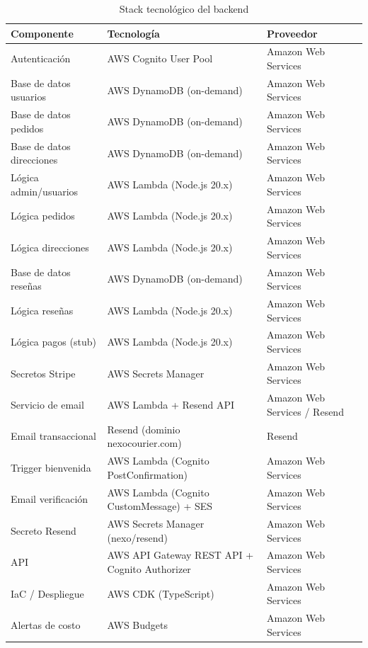 \documentclass[12pt,a4paper]{article}
\begin{document}
\begin{table}[H]
\centering
\begin{tabular}{@{}lll@{}}
\toprule
\textbf{Componente} & \textbf{Tecnología} & \textbf{Proveedor} \\
\midrule
Autenticación & AWS Cognito User Pool & Amazon Web Services \\
Base de datos usuarios & AWS DynamoDB (on-demand) & Amazon Web Services \\
Base de datos pedidos & AWS DynamoDB (on-demand) & Amazon Web Services \\
Base de datos direcciones & AWS DynamoDB (on-demand) & Amazon Web Services \\
Lógica admin/usuarios & AWS Lambda (Node.js 20.x) & Amazon Web Services \\
Lógica pedidos & AWS Lambda (Node.js 20.x) & Amazon Web Services \\
Lógica direcciones & AWS Lambda (Node.js 20.x) & Amazon Web Services \\
Base de datos reseñas & AWS DynamoDB (on-demand) & Amazon Web Services \\
Lógica reseñas & AWS Lambda (Node.js 20.x) & Amazon Web Services \\
Lógica pagos (stub) & AWS Lambda (Node.js 20.x) & Amazon Web Services \\
Secretos Stripe & AWS Secrets Manager & Amazon Web Services \\
Servicio de email & AWS Lambda + Resend API & Amazon Web Services / Resend \\
Email transaccional & Resend (dominio nexocourier.com) & Resend \\
Trigger bienvenida & AWS Lambda (Cognito PostConfirmation) & Amazon Web Services \\
Email verificación & AWS Lambda (Cognito CustomMessage) + SES & Amazon Web Services \\
Secreto Resend & AWS Secrets Manager (nexo/resend) & Amazon Web Services \\
API & AWS API Gateway REST API + Cognito Authorizer & Amazon Web Services \\
IaC / Despliegue & AWS CDK (TypeScript) & Amazon Web Services \\
Alertas de costo & AWS Budgets & Amazon Web Services \\
\bottomrule
\end{tabular}
\caption{Stack tecnológico del backend}
\end{table}

\end{document}
